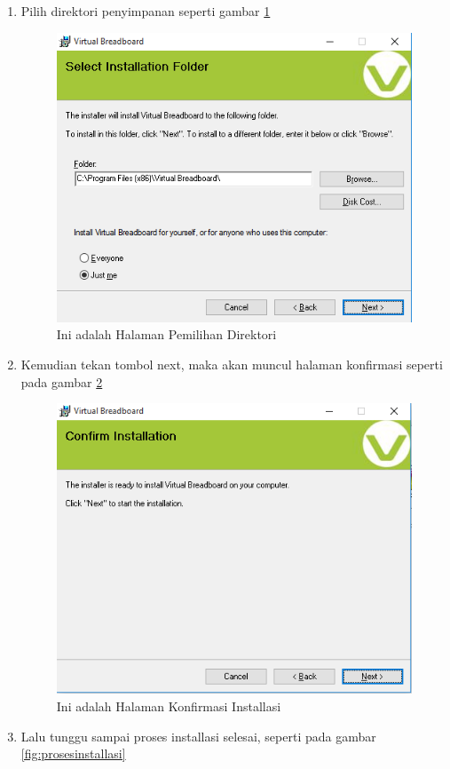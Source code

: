 \begin{enumerate}
\begin{enumerate}
\begin{figure}[!htbp]
            \end{figure}
        \item Pilih direktori penyimpanan seperti gambar \ref{fig:memilihdirektori}
            \begin{figure}[!htbp]
            \centering
            \includegraphics[width=.75\textwidth]{figures/VBB/memilihdirektori.png}
            \caption{Ini adalah Halaman Pemilihan Direktori}\label{fig:memilihdirektori}
            \end{figure}
        \item Kemudian tekan tombol next, maka akan muncul halaman konfirmasi seperti pada gambar \ref{fig:konfirmasiinstall}
            \begin{figure}[!htbp]
            \centering
            \includegraphics[width=.75\textwidth]{figures/VBB/konfirmasiinstall.png}
            \caption{Ini adalah Halaman Konfirmasi Installasi}\label{fig:konfirmasiinstall}
            \end{figure}
        \item Lalu tunggu sampai proses installasi selesai, seperti pada gambar \ref{fig:prosesinstallasi}

\end{enumerate}
\end{enumerate}
